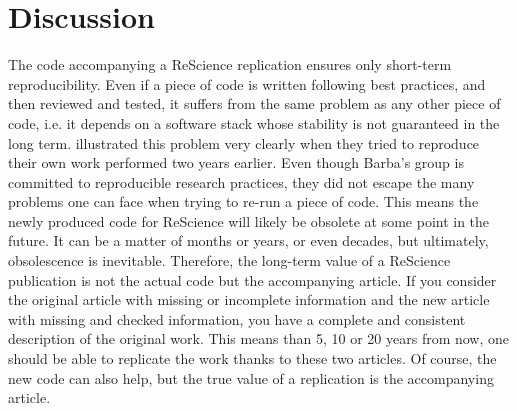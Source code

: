 \documentclass[a4paper,10pt, twocolumn]{article}
\begin{document}
\section*{Discussion}

The code accompanying a ReScience replication ensures only short-term
reproducibility. Even if a piece of code is written following best practices,
and then reviewed and tested, it suffers from the same problem as any other piece of
code, i.e. it depends on a software stack whose stability is not guaranteed in
the long term. \citep{Mesnard:2016} illustrated this problem very clearly when
they tried to reproduce their own work performed two years earlier. Even though Barba's
group is committed to reproducible research practices, they did not escape the many
problems one can face when trying to re-run a piece of code. This means the
newly produced code for ReScience will likely be obsolete at some point in the
future. It can be a matter of months or years, or even decades, but ultimately, obsolescence is inevitable. Therefore, the long-term value of a ReScience
publication is not the actual code but the accompanying article. If you
consider the original article with missing or incomplete information and the
new article with missing and checked information, you have a complete and
consistent description of the original work. This means than 5, 10 or 20 years
from now, one should be able to replicate the work thanks to these two
articles. Of course, the new code can also help, but the true value of a
replication is the accompanying article.





\renewcommand*{\bibfont}{\footnotesize}
\printbibliography[title=References]
\end{document}
